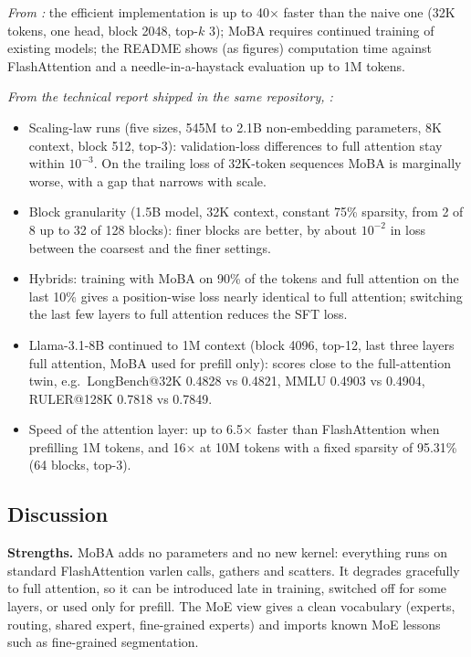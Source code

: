 \begin{results}
\emph{From :} the efficient implementation is up to
40$\times$ faster than the naive one (32K tokens, one head, block 2048, top-$k$ 3); MoBA
requires continued training of existing models; the README shows (as figures) computation time
against FlashAttention and a needle-in-a-haystack evaluation up to 1M tokens.

\emph{From the technical report shipped in the same repository,
:}
\begin{itemize}
  \item Scaling-law runs (five sizes, 545M to 2.1B non-embedding parameters, 8K context, block
  512, top-3): validation-loss differences to full attention stay within $10^{-3}$. On the
  trailing loss of 32K-token sequences MoBA is marginally worse, with a gap that narrows with
  scale.
  \item Block granularity (1.5B model, 32K context, constant 75\% sparsity, from 2 of 8 up to
  32 of 128 blocks): finer blocks are better, by about $10^{-2}$ in loss between the coarsest
  and the finer settings.
  \item Hybrids: training with MoBA on 90\% of the tokens and full attention on the last 10\%
  gives a position-wise loss nearly identical to full attention; switching the last few layers
  to full attention reduces the SFT loss.
  \item Llama-3.1-8B continued to 1M context (block 4096, top-12, last three layers full
  attention, MoBA used for prefill only): scores close to the full-attention twin, e.g.\
  LongBench@32K 0.4828 vs 0.4821, MMLU 0.4903 vs 0.4904, RULER@128K 0.7818 vs 0.7849.
  \item Speed of the attention layer: up to 6.5$\times$ faster than FlashAttention when
  prefilling 1M tokens, and 16$\times$ at 10M tokens with a fixed sparsity of 95.31\% (64
  blocks, top-3).
\end{itemize}
\end{results}

\subsection{Discussion}

\textbf{Strengths.} MoBA adds no parameters and no new kernel: everything runs on standard
FlashAttention varlen calls, gathers and scatters. It degrades gracefully to full attention, so
it can be introduced late in training, switched off for some layers, or used only for prefill.
The MoE view gives a clean vocabulary (experts, routing, shared expert, fine-grained experts)
and imports known MoE lessons such as fine-grained segmentation.

